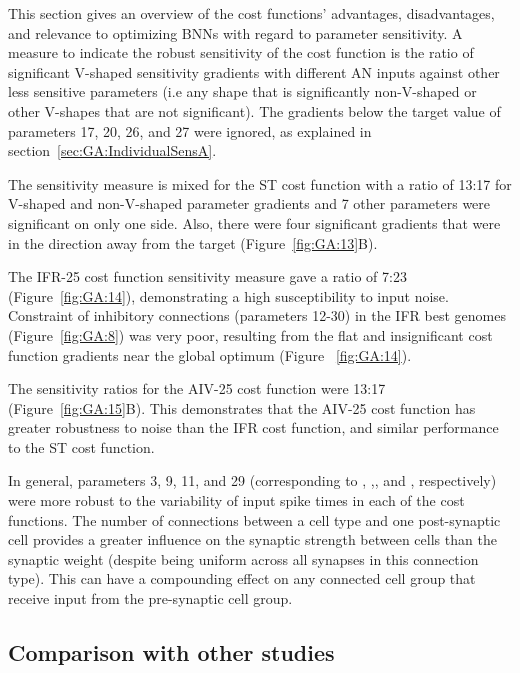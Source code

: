 This section gives an overview of the cost functions' advantages,
disadvantages, and relevance to optimizing BNNs with regard to
parameter sensitivity.  A measure to indicate the robust sensitivity
of the cost function is the ratio of significant V-shaped sensitivity
gradients with different AN inputs against other less sensitive
parameters (i.e any shape that is significantly non-V-shaped or other
V-shapes that are not significant). The gradients below the target
value of parameters 17, 20, 26, and 27 were ignored, as explained in
section~\ref{sec:GA:IndividualSensA}.

\smallskip{}

The sensitivity measure is mixed for the ST cost function with a ratio
of 13:17 for V-shaped and non-V-shaped parameter gradients and 7 other
parameters were significant on only one side. Also, there were four
significant gradients that were in the direction away from the target
(Figure~\ref{fig:GA:13}B).

\smallskip{}

The IFR-25 cost function sensitivity measure gave a ratio of 7:23
(Figure~\ref{fig:GA:14}), demonstrating a high susceptibility to input
noise. Constraint of inhibitory connections (parameters 12-30) in the
IFR best genomes (Figure~\ref{fig:GA:8}) was very poor, resulting from
the flat and insignificant cost function gradients near the global
optimum (Figure ~\ref{fig:GA:14}).

\smallskip{}

The sensitivity ratios for the AIV-25 cost function were 13:17
(Figure~\ref{fig:GA:15}B).  This demonstrates that the AIV-25 cost
function has greater robustness to noise than the IFR cost function,
and similar performance to the ST cost function.

\smallskip{}

In general, parameters 3, 9, 11, and 29 (corresponding to \nHSRTS,
\nHSRTV,\nLSRGLG, and \nGLGDS, respectively) were more robust to the
variability of input spike times in each of the cost functions.  The
number of connections between a cell type and one post-synaptic cell
provides a greater influence on the synaptic strength between cells
than the synaptic weight (despite being uniform across all synapses in
this connection type). This can have a compounding effect on any
connected cell group that receive input from the pre-synaptic cell
group.


\subsection{Comparison with other studies}\label{sec:GA:comp-with-other}


